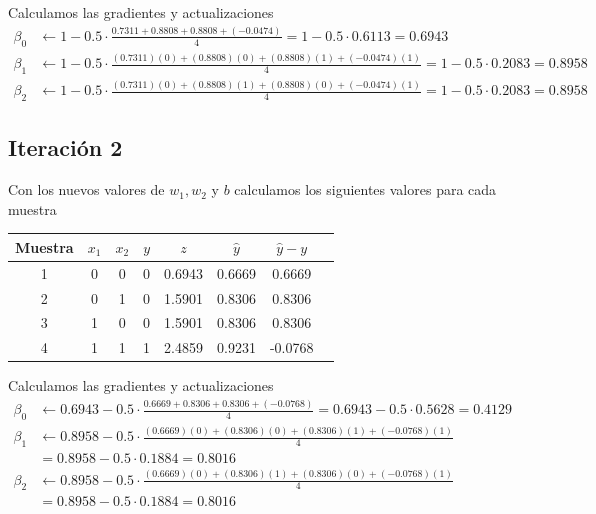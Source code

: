 Calculamos las gradientes y actualizaciones
\begin{align*}
    \beta_0 &\gets 1 - 0.5 \cdot \frac{0.7311 + 0.8808 + 0.8808 + (- 0.0474)}{4} = 1 - 0.5 \cdot 0.6113 = 0.6943 \\
    \beta_1 &\gets 1 - 0.5 \cdot \frac{(0.7311)(0) + (0.8808)(0) + (0.8808)(1) + (-0.0474)(1)}{4} =1 - 0.5 \cdot 0.2083 = 0.8958 \\
    \beta_2 &\gets 1 - 0.5 \cdot \frac{(0.7311)(0) + (0.8808)(1) + (0.8808)(0) + (-0.0474)(1)}{4} = 1 - 0.5 \cdot 0.2083 = 0.8958
\end{align*}

\subsection*{Iteración 2}
Con los nuevos valores de $w_1, w_2$ y $b$ calculamos los siguientes valores para cada muestra
\begin{center}
    \begin{tabular}{c||c|c|c|c|c|c|c}
        Muestra &$x_1$ & $x_2$ & $y$ & $z$ & $\hat{y}$ & $\hat{y} - y$ \\
        \hline
        1&0 & 0 & 0 & 0.6943 & 0.6669 & 0.6669 \\
        2&0 & 1 & 0 & 1.5901 & 0.8306 & 0.8306 \\
        3&1 & 0 & 0 & 1.5901 & 0.8306 & 0.8306 \\
        4&1 & 1 & 1 & 2.4859 & 0.9231 & -0.0768
    \end{tabular}
\end{center}
Calculamos las gradientes y actualizaciones
\begin{align*}
    \beta_0 &\gets 0.6943 - 0.5 \cdot \frac{0.6669 + 0.8306 + 0.8306 + (- 0.0768)}{4} = 0.6943 - 0.5 \cdot 0.5628 = 0.4129 \\
    \beta_1 &\gets 0.8958 - 0.5 \cdot \frac{(0.6669)(0) + (0.8306)(0) + (0.8306)(1) + (-0.0768)(1)}{4}\\
            &= 0.8958 - 0.5 \cdot 0.1884 = 0.8016 \\
    \beta_2 &\gets 0.8958 - 0.5 \cdot \frac{(0.6669)(0) + (0.8306)(1) + (0.8306)(0) + (-0.0768)(1)}{4}\\
            &= 0.8958 - 0.5 \cdot 0.1884 = 0.8016
\end{align*}

